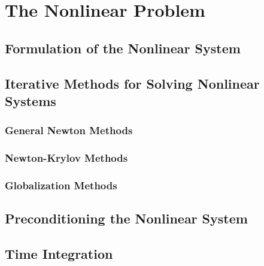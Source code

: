 \chapter{The Nonlinear Problem}
\label{ch:nonlinear_problem}

\section{Formulation of the Nonlinear System}
\label{sec:nonlinear_system}

\section{Iterative Methods for Solving Nonlinear Systems}
\label{sec:nonlinear_methods}

\subsection{General Newton Methods}
\label{subsec:newton_methods}

\subsection{Newton-Krylov Methods}
\label{subsec:newton_krylov_methods}

\subsection{Globalization Methods}
\label{subsec:globalization_methods}

\section{Preconditioning the Nonlinear System}
\label{sec:nonlinear_preconditioning}

\section{Time Integration}
\label{sec:time_integration}
